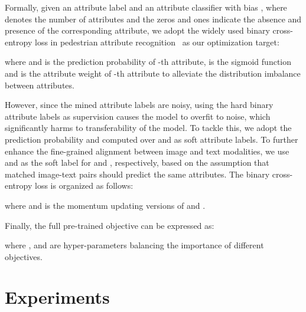 \documentclass[final]{cvpr}
\begin{document}
Formally, given an attribute label  and an attribute classifier  with bias , where  denotes the number of attributes and the zeros and ones indicate the absence and presence of the corresponding attribute, we adopt the widely used binary cross-entropy loss in pedestrian attribute recognition~\cite{jia2021spatial} as our optimization target: \par
\vspace{-4mm}
\begin{small} 

\end{small}

where  and  is the prediction probability of -th attribute,  is the sigmoid function and  is the attribute weight of -th attribute to alleviate the distribution imbalance between attributes.

However, since the mined attribute labels are noisy, using the hard binary attribute labels  as supervision causes the model to overfit to noise, which significantly harms to transferability of the model.
To tackle this, we adopt the prediction probability  and  computed over  and  as soft attribute labels.
To further enhance the fine-grained alignment between image and text modalities, we use  and  as the soft label for  and , respectively, based on the assumption that matched image-text pairs should predict the same attributes.
The binary cross-entropy loss is organized as follows: \par
\begin{small} 
\vspace{-4mm}

\end{small}

where  and  is the momentum updating versions of  and  .

Finally, the full pre-trained objective can be expressed as:
\vspace{-2mm}
\begin{small}

\end{small}

\vspace{-4mm}
\noindent
where ,  and  are hyper-parameters balancing the importance of different objectives.

\section{Experiments}
\end{document}
